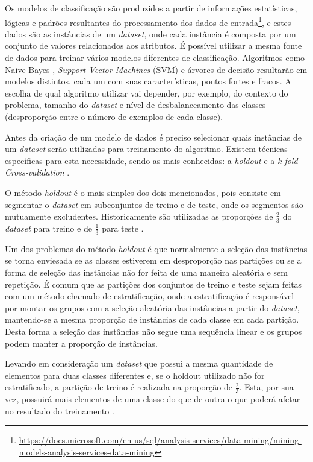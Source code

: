Os modelos de classificação são produzidos a partir de informações estatísticas, lógicas e padrões resultantes do processamento dos dados de entrada\footnote{\url{https://docs.microsoft.com/en-us/sql/analysis-services/data-mining/mining-models-analysis-services-data-mining}}, e estes dados são as instâncias de um \emph{dataset}, onde cada instância é composta por um conjunto de valores relacionados aos atributos. É possível utilizar a mesma fonte de dados para treinar vários modelos diferentes de classificação. Algoritmos como Naive Bayes \cite{Mccallum1998}, \emph{Support Vector Machines} (SVM) \cite{Meyer2017} e árvores de decisão \cite{Schmid2013} resultarão em modelos distintos, cada um com suas características, pontos fortes e fracos. A escolha de qual algoritmo utilizar vai depender, por exemplo, do contexto do problema, tamanho do \emph{dataset} e nível de desbalanceamento das classes (desproporção entre o número de exemplos de cada classe).

Antes da criação de um modelo de dados é preciso selecionar quais instâncias de um \emph{dataset} serão utilizadas para treinamento do algoritmo. Existem técnicas específicas para esta necessidade, sendo as mais conhecidas: a \emph{holdout} e a \emph{k-fold Cross-validation} \cite{Kohavi1995}.

O método \emph{holdout} é o mais simples dos dois mencionados, pois consiste em segmentar o \emph{dataset} em subconjuntos de treino e de teste, onde os segmentos são mutuamente excludentes. Historicamente são utilizadas as proporçòes de $\frac{2}{3}$ do \emph{dataset} para treino e de $\frac{1}{3}$ para teste \cite{Kohavi1995}.

Um dos problemas do método \emph{holdout} é que normalmente a seleção das instâncias se torna enviesada se as classes estiverem em desproporção nas partições ou se a forma de seleção das instâncias não for feita de uma maneira aleatória e sem repetição. É comum que as partições dos conjuntos de treino e teste sejam feitas com um método chamado de estratificação, onde a estratificação é responsável por montar os grupos com a seleção aleatória das instâncias a partir do \textit{dataset}, mantendo-se a mesma proporção de instâncias de cada classe em cada partição. Desta forma a seleção das instâncias não segue uma sequência linear e os grupos podem manter a proporção de instâncias.

Levando em consideração um \emph{dataset} que possui a mesma quantidade de elementos para duas classes diferentes e, se o holdout utilizado não for estratificado, a partição de treino é realizada na proporção de $\frac{2}{3}$. Esta, por sua vez, possuirá mais elementos de uma classe do que de outra o que poderá afetar no resultado do treinamento \cite{Witten2016}.

